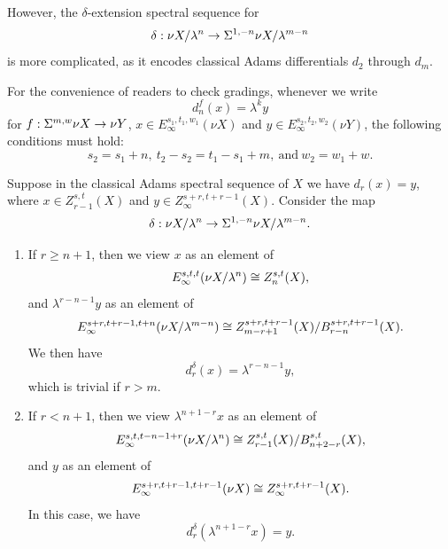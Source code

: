 However, the $\delta$-extension spectral sequence for
$$\delta:\nu X/\lambda^n\to \Sigma^{1,-n}\nu X/\lambda^{m-n}$$
is more complicated, as it encodes classical Adams differentials $d_2$ through $d_m$.

\begin{remark}
    For the convenience of readers to check gradings, whenever we write 
    $$d_{n}^{f}(x)=\lambda^k y$$
    for $f: \Sigma^{m,w} \nu X\to \nu Y$,
    $x\in E_\infty^{s_1,t_1,w_1}(\nu X)$ and
    $y\in E_\infty^{s_2,t_2,w_2}(\nu Y)$,
    the following conditions must hold: 
    $$s_2=s_1+n, \ t_2-s_2=t_1-s_1+m, \ \text{and} \ w_2=w_1+w.$$
\end{remark}

\begin{proposition}\label{prop:delta-ess-adams}
    Suppose in the classical Adams spectral sequence of $X$ we have $d_r(x)=y$, where $x\in Z_{r-1}^{s,t}(X)$ and $y\in Z_\infty^{s+r,t+r-1}(X)$. Consider the map
    $$\delta:\nu X/\lambda^n\to \Sigma^{1,-n}\nu X/\lambda^{m-n}.$$
    \begin{enumerate}
        \item If $r\ge n+1$, then we view $x$ as an element of 
        $$E_\infty^{s,t,t}(\nu X/\lambda^n)\cong Z_n^{s,t}(X),$$
        and $\lambda^{r-n-1} y$ as an element of 
        $$E_\infty^{s+r,t+r-1, t+n}(\nu X/\lambda^{m-n})\cong Z_{m-r+1}^{s+r,t+r-1}(X)/B_{r-n}^{s+r,t+r-1}(X).$$
        We then have
        $$d^{\delta}_r(x)=\lambda^{r-n-1}y,$$
        which is trivial if $r>m$.
        \item If $r<n+1$, then we view $\lambda^{n+1-r}x$ as an element of 
        $$E_\infty^{s,t,t-n-1+r}(\nu X/\lambda^n)\cong Z^{s,t}_{r-1}(X)/B^{s,t}_{n+2-r}(X),$$
        and $y$ as an element of 
        $$E_\infty^{s+r,t+r-1, t+r-1}(\nu X)\cong Z_\infty^{s+r,t+r-1}(X).$$
        In this case, we have
        $$d^{\delta}_r(\lambda^{n+1-r}x)=y.$$
    \end{enumerate}
\end{proposition}
